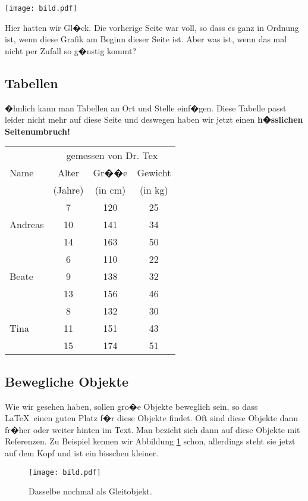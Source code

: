 \documentclass[11pt,a4paper]{article} %
\begin{document}
\begin{center}
\texttt{[image: bild.pdf]}
\end{center}

Hier hatten wir Gl�ck. Die vorherige Seite war voll, so dass es ganz in Ordnung ist, wenn diese Grafik am Beginn dieser Seite ist. Aber was ist, wenn das mal nicht per Zufall so g�nstig kommt?

\subsection{Tabellen}
\label{Tabellen}

�hnlich kann man Tabellen an Ort und Stelle einf�gen. Diese Tabelle passt leider nicht mehr auf diese Seite und deswegen haben wir jetzt einen \textbf{h�sslichen Seitenumbruch!}

\begin{center}
\begin{tabular}{|l||c|c|c|}
\hline
           & \multicolumn{3}{|c|}{gemessen von Dr. Tex} \\
\cline{2-4}
Name       &  Alter    & Gr��e   & Gewicht \\
           &  (Jahre)  & (in cm) & (in kg) \\
\hline
\hline
           &   7       &  120    &  25     \\
\cline{2-4}
Andreas    &   10      &  141    &  34     \\
\cline{2-4}
           &   14      &  163    &  50     \\
\hline
           &   6       &  110    &  22     \\
\cline{2-4}
Beate      &   9       &  138    &  32     \\
\cline{2-4}
           &   13      &  156    &  46     \\
\hline
           &   8       &  132    &  30     \\
\cline{2-4}
Tina       &   11      &  151    &  43     \\
\cline{2-4}
           &   15      &  174    &  51     \\
\hline
\end{tabular}
\end{center}

\subsection{Bewegliche Objekte}
\label{Floats}

Wie wir gesehen haben, sollen gro�e Objekte beweglich sein, so dass \LaTeX\ einen guten Platz f�r diese Objekte findet. Oft sind diese Objekte dann fr�her oder weiter hinten im Text. Man bezieht sich dann auf diese Objekte mit Referenzen. Zu Beispiel kennen wir Abbildung \ref{bild} schon, allerdings steht sie jetzt auf dem Kopf und ist ein bisschen kleiner.

\begin{figure}[h]
\begin{center}
\texttt{[image: bild.pdf]}
\caption{Dasselbe nochmal als Gleitobjekt. \label{bild}}
\end{center}
\end{figure}

\end{document}
